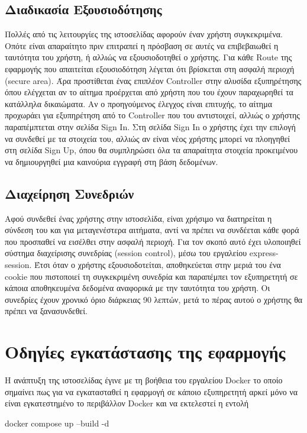 \documentclass[manuscript,screen,review, language=greek, language=english]{acmart}
\begin{document}
\subsection{Διαδικασία Εξουσιοδότησης}
	Πολλές από τις λειτουργίες της ιστοσελίδας αφορούν έναν χρήστη συγκεκριμένα. Οπότε
	είναι απαραίτητο πριν επιτραπεί η πρόσβαση σε αυτές να επιβεβαιωθεί η ταυτότητα του
	χρήστη, ή αλλιώς να εξουσιοδοτηθεί ο χρήστης. Για κάθε Route της εφαρμογής που
	απαιτείται εξουσιοδότηση λέγεται ότι βρίσκεται στη ασφαλή περιοχή (secure area). Άρα
	προστίθεται ένας επιπλέον Controller στην αλυσίδα εξυπηρέτησης όπου ελέγχεται αν το
	αίτημα προέρχεται από χρήστη που του έχουν παραχωρηθεί τα κατάλληλα δικαιώματα. Αν ο
	προηγούμενος έλεγχος είναι επιτυχής, το αίτημα προχωράει για εξυπηρέτηση από το
	Controller που του αντιστοιχεί, αλλιώς ο χρήστης παραπέμπτεται στην σελίδα Sign In.
	Στη σελίδα Sign In ο χρήστης έχει την επιλογή να συνδεθεί με τα στοιχεία του, αλλιώς
	αν είναι νέος χρήστης μπορεί να πλοηγηθεί στη σελίδα Sign Up, όπου θα συμπληρώσει όλα
	τα απαραίτητα στοιχεία προκειμένου να δημιουργηθεί μια καινούρια εγγραφή στη βάση
	δεδομένων.

\subsection{Διαχείρηση Συνεδριών}
	Αφού συνδεθεί ένας χρήστης στην ιστοσελίδα, είναι χρήσιμο να διατηρείται η σύνδεση
	του και για μεταγενέστερα αιτήματα, αντί να πρέπει να συνδέεται κάθε φορά που
	προσπαθεί να εισέλθει στην ασφαλή περιοχή. Για τον σκοπό αυτό έχει υλοποιηθεί σύστημα
	διαχείρισης συνεδρίας (session control), μέσω του εργαλείου express-session. Έτσι
	όταν ο χρήστης εξουσιοδοτείται, αποθηκεύεται στην μεριά του ένα cookie που πιστοποιεί
	τη συγκεκριμένη συνεδρία και παραπέμπει τον εξυπηρετητή σε κάποια αποθηκευμένα
	δεδομένα αναφορικά με την ταυτότητα του χρήστη. Οι συνεδρίες έχουν χρονικό όριο
	διάρκειας 90 λεπτών, μετά το πέρας αυτού ο χρήστης θα πρέπει να ξανασυνδεθεί.




\appendix

\section{Οδηγίες εγκατάστασης της εφαρμογής}
	Η ανάπτυξη της ιστοσελίδας έγινε με τη βοήθεια του εργαλείου Docker το οποίο σημαίνει
	πως για να εγκατασταθεί η εφαρμογή σε κάποιο εξυπηρετητή αρκεί μόνο να είναι
	εγκατεστημένο το περιβάλλον Docker και να εκτελεστεί η εντολή

	docker compose up --build -d
\end{document}
